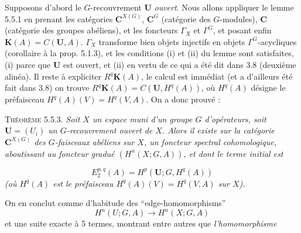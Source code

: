 Supposons d'abord le $G$-recouvrement ${\mathbf U}$ \textit{ouvert}. Nous allons appliquer
le lemme 5.5.1 en prenant les catégories ${\mathbf C}^{X(G)}$, ${\mathbf C}^G$ (catégorie des
$G$-modules), ${\mathbf C}$ (catégorie des groupes abéliens), et les foncteurs
$\Gamma_X$ et $\Gamma^G$, et posant enfin $\mathbf K(A)=C({\mathbf U},A)$.
$\Gamma_X$ transforme bien objets injectifs en objets
$\Gamma^G$-acycliques (corollaire à la prop. 5.1.3), et les conditions (i) et
(ii) du lemme sont satisfaites, (i) parce que ${\mathbf U}$ est ouvert, et (ii)
en vertu de ce qui a été dit dans 3.8 (deuxième alinéa). Il reste à expliciter
$R^q\mathbf K(A)$, le calcul est immédiat (et a d'ailleurs été fait dans 3.8)
on trouve $R^q\mathbf K(A)=C({\mathbf U},H^q(A))$, où $H^q(A)$ désigne le
préfaisceau $H^q(A)(V)=H^q(V,A)$. On a donc prouvé :

\textsc{Théorème 5.5.3.} \textit{Soit $X$ un espace muni d'un groupe
$G$ d'opérateurs, soit ${\mathbf U}=(U_i)$ un $G$-recouvrement ouvert de $X$.
Alors il existe sur la catégorie ${\mathbf C}^{X(G)}$ des $G$-faisceaux abéliens sur $X$,
un foncteur spectral cohomologique, aboutissant au foncteur gradué
$(H^n(X;G,A))$, et dont le terme initial est}

\[
\tag{5.5.4}
E_2^{p,q}(A)=H^p({\mathbf U};G,H^q(A))
\]
\textit{(où $H^q(A)$ est le préfaisceau $H^q(A)(V)=H^q(V,A)$ sur $X$).}

On en conclut comme d'habitude des ``edge-homomorphisms''
\[
\tag{5.5.5}
H^n(U;G,A)\to H^n(X;G,A)
\]
et une suite exacte à 5 termes, montrant entre autres que \textit{l'homomorphisme}

